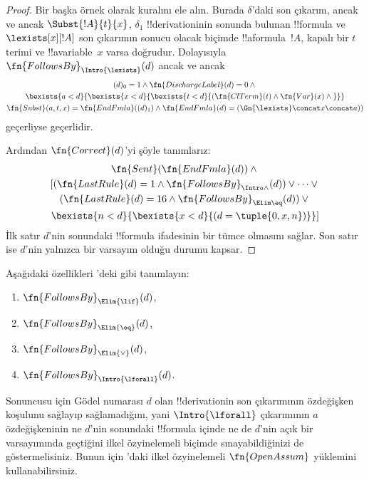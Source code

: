 \begin{proof}
  Bir başka örnek olarak \Intro{\lexists} kuralını ele alın. Burada
  $\delta$'daki son çıkarım, ancak ve ancak $\Subst{!A}{t}{x}$,
  $\delta_1$ !!{derivation}{}inin sonunda bulunan !!{formula} ve
  $\lexists[x][!A]$ son çıkarımın sonucu olacak biçimde !!a{formula}~$!A$,
  kapalı bir $t$ terimi ve !!a{variable}~$x$ varsa doğrudur. Dolayısıyla
  $\fn{FollowsBy}_{\Intro{\lexists}}(d)$ ancak ve ancak
  \begin{multline*}
    (d)_0 = 1 \land \fn{DischargeLabel}(d) = 0 \land {} \\
    \bexists{a < d}{\bexists{x<d}{\bexists{t<d}{
          (\fn{ClTerm}(t) \land \fn{Var}(x)  \land {}}}}\\
    \fn{Subst}(a,t,x) = \fn{EndFmla}((d)_1) \land
    \fn{EndFmla}(d) = (\Gn{\lexists} \concat x \concat a))
  \end{multline*}
  geçerliyse geçerlidir.

  Ardından $\fn{Correct}(d)$'yi şöyle tanımlarız:
  \begin{multline*}
    \fn{Sent}(\fn{EndFmla}(d)) \land {}\\
    [(\fn{LastRule}(d) = 1 \land
    \fn{FollowsBy}_{\Intro\land}(d)) \lor \dots \lor {}\\
    (\fn{LastRule}(d) = 16 \land \fn{FollowsBy}_{\Elim\eq}(d)) \lor {}\\
    \bexists{n<d}{\bexists{x<d}{(d = \tuple{0, x, n})}}]
  \end{multline*}
  İlk satır $d$'nin sonundaki !!{formula} ifadesinin bir tümce olmasını sağlar. Son satır
  ise $d$'nin yalnızca bir varsayım olduğu durumu kapsar.
\end{proof}

\begin{prob}
  Aşağıdaki özellikleri 'deki gibi
  tanımlayın:
  \begin{enumerate}
  \item $\fn{FollowsBy}_{\Elim{\lif}}(d)$,
  \item $\fn{FollowsBy}_{\Elim{\eq}}(d)$,
  \item $\fn{FollowsBy}_{\Elim{\lor}}(d)$,
  \item $\fn{FollowsBy}_{\Intro{\lforall}}(d)$.
  \end{enumerate}
  Sonuncusu için Gödel numarası $d$ olan !!{derivation}{}in son çıkarımının
  özdeğişken koşulunu sağlayıp sağlamadığını, yani
  $\Intro{\lforall}$ çıkarımının $a$ özdeğişkeninin ne $d$'nin sonundaki
  !!{formula} içinde ne de $d$'nin açık bir varsayımında geçtiğini ilkel
  özyinelemeli biçimde sınayabildiğinizi de göstermelisiniz. Bunun için
  'daki ilkel özyinelemeli
  $\fn{OpenAssum}$ yüklemini kullanabilirsiniz.
\end{prob}

